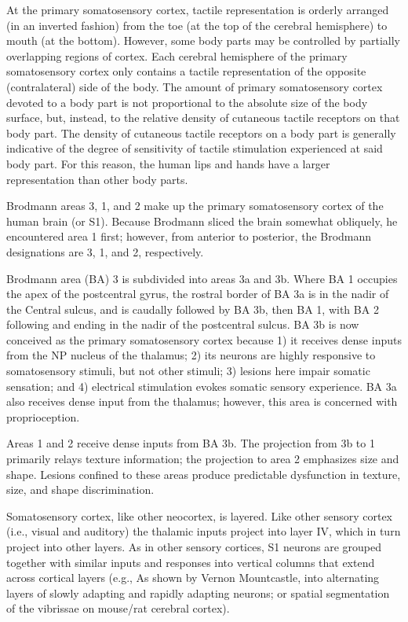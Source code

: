 At the primary somatosensory cortex, tactile representation is orderly arranged (in an inverted fashion) from the toe (at the top of the cerebral hemisphere) to mouth (at the bottom). However, some body parts may be controlled by partially overlapping regions of cortex. Each cerebral hemisphere of the primary somatosensory cortex only contains a tactile representation of the opposite (contralateral) side of the body. The amount of primary somatosensory cortex devoted to a body part is not proportional to the absolute size of the body surface, but, instead, to the relative density of cutaneous tactile receptors on that body part. The density of cutaneous tactile receptors on a body part is generally indicative of the degree of sensitivity of tactile stimulation experienced at said body part. For this reason, the human lips and hands have a larger representation than other body parts.

Brodmann areas 3, 1, and 2 make up the primary somatosensory cortex of the human brain (or S1). Because Brodmann sliced the brain somewhat obliquely, he encountered area 1 first; however, from anterior to posterior, the Brodmann designations are 3, 1, and 2, respectively.

Brodmann area (BA) 3 is subdivided into areas 3a and 3b. Where BA 1 occupies the apex of the postcentral gyrus, the rostral border of BA 3a is in the nadir of the Central sulcus, and is caudally followed by BA 3b, then BA 1, with BA 2 following and ending in the nadir of the postcentral sulcus. BA 3b is now conceived as the primary somatosensory cortex because 1) it receives dense inputs from the NP nucleus of the thalamus; 2) its neurons are highly responsive to somatosensory stimuli, but not other stimuli; 3) lesions here impair somatic sensation; and 4) electrical stimulation evokes somatic sensory experience. BA 3a also receives dense input from the thalamus; however, this area is concerned with proprioception.

Areas 1 and 2 receive dense inputs from BA 3b. The projection from 3b to 1 primarily relays texture information; the projection to area 2 emphasizes size and shape. Lesions confined to these areas produce predictable dysfunction in texture, size, and shape discrimination.

Somatosensory cortex, like other neocortex, is layered. Like other sensory cortex (i.e., visual and auditory) the thalamic inputs project into layer IV, which in turn project into other layers. As in other sensory cortices, S1 neurons are grouped together with similar inputs and responses into vertical columns that extend across cortical layers (e.g., As shown by Vernon Mountcastle, into alternating layers of slowly adapting and rapidly adapting neurons; or spatial segmentation of the vibrissae on mouse/rat cerebral cortex).

